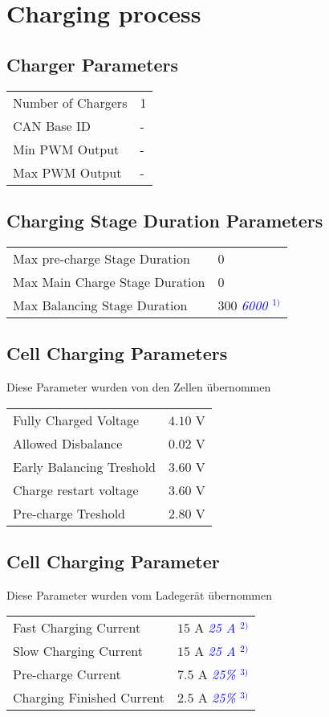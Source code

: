 \section*{Charging process}
\subsection*{Charger Parameters}
\begin{tabular}{p{11cm}p{2cm}}
	Number of Chargers & 1 \\
	CAN Base ID & - \\
	Min PWM Output & - \\
	Max PWM Output & -
\end{tabular}
\subsection*{Charging Stage Duration Parameters}
\begin{tabular}{p{11cm}p{2cm}}
	Max pre-charge Stage Duration & 0 \\
	Max Main Charge Stage Duration & 0 \\
	Max Balancing Stage Duration & 300 \textcolor{blue}{\textit{6000 $^{1)}$}}
\end{tabular}
\subsection*{Cell Charging Parameters}
Diese Parameter wurden von den Zellen übernommen \cite{lev50}\\
\begin{tabular}{p{11cm}p{2cm}}
	Fully Charged Voltage & $4.10$ V \\
	Allowed Disbalance & $0.02$ V \\
	Early Balancing Treshold & $3.60$ V \\
	Charge restart voltage & $3.60$ V \\
	Pre-charge Treshold & $2.80$ V
\end{tabular}
\subsection*{Cell Charging Parameter}
Diese Parameter wurden vom Ladegerät übernommen \cite{ladegeraet}\\
\begin{tabular}{p{11cm}p{3cm}}
	Fast Charging Current & $15$ A \textcolor{blue}{\textit{25 A $^{2)}$}}\\
	Slow Charging Current & $15$ A \textcolor{blue}{\textit{25 A $^{2)}$}}\\
	Pre-charge Current & $7.5$ A \textcolor{blue}{\textit{25\% $^{3)}$}}\\
	Charging Finished Current & $2.5$ A \textcolor{blue}{\textit{25\% $^{3)}$}}
\end{tabular}

